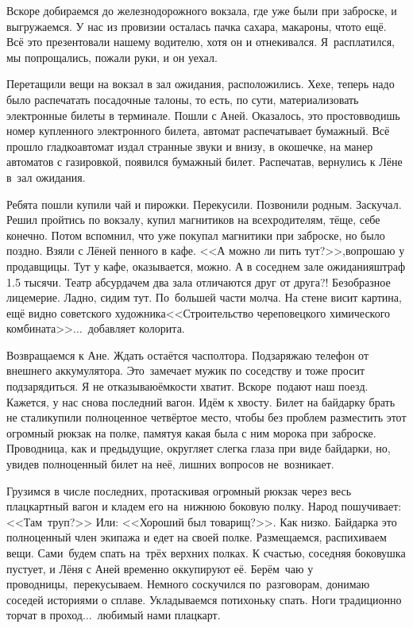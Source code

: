 Вскоре добираемся до железнодорожного вокзала, где уже были при заброске, и выгружаемся. У нас из провизии осталась пачка сахара, макароны, что\sdash то ещё. Всё это презентовали нашему водителю, хотя он и отнекивался. Я~расплатился, мы попрощались, пожали руки, и он уехал. 

Перетащили вещи на вокзал в зал ожидания, расположились. Хе\sdash хе, теперь надо было распечатать посадочные талоны, то есть, по сути, материализовать электронные билеты в терминале. Пошли с Аней. Оказалось, это просто\mdash вводишь номер купленного электронного билета, автомат распечатывает бумажный. Всё прошло гладко\mdash автомат издал странные звуки и внизу, в окошечке, на манер автоматов с газировкой, появился бумажный билет. Распечатав, вернулись к Лёне в~зал ожидания. 

Ребята пошли купили чай и пирожки. Перекусили. Позвонили родным. Заскучал. Решил пройтись по вокзалу, купил магнитиков на всех\mdash родителям, тёще, себе конечно. Потом вспомнил, что уже покупал магнитики при заброске, но было поздно. Взяли с Лёней пенного в кафе. <<А можно ли пить тут?>>,\mdash вопрошаю у продавщицы. Тут у кафе, оказывается, можно. А в соседнем зале ожидания\mdash штраф 1.5 тысячи. Театр абсурда\mdash чем два зала отличаются друг от друга?! Безобразное лицемерие. Ладно, сидим тут. По~большей части молча. На стене висит картина, ещё видно советского художника\mdash <<Строительство череповецкого химического комбината>>$\ldots$~добавляет колорита. 

Возвращаемся к Ане. Ждать остаётся час\sdash полтора. Подзаряжаю телефон от внешнего аккумулятора. Это~замечает мужик по соседству и тоже просит подзарядиться. Я не отказываю\mdash ёмкости хватит. Вскоре~подают наш поезд. Кажется, у нас снова последний вагон. Идём к хвосту. Билет на байдарку брать не стали\mdash купили полноценное четвёртое место, чтобы без проблем разместить этот огромный рюкзак на полке, памятуя какая была с ним морока при заброске. Проводница, как и предыдущие, округляет слегка глаза при виде байдарки, но, увидев полноценный билет на неё, лишних вопросов не~возникает.
 
Грузимся в числе последних, протаскивая огромный рюкзак через весь плацкартный вагон и кладем его на~нижнюю боковую полку. Народ пошучивает: <<Там~труп?>> Или: <<Хороший был товарищ?>>. Как низко. Байдарка это полноценный член экипажа и едет на своей полке. Размещаемся, распихиваем вещи. Сами~будем спать на~трёх верхних полках. К счастью, соседняя боковушка пустует, и Лёня с Аней временно оккупируют её. Берём~чаю у проводницы,~перекусываем. Немного соскучился по~разговорам, донимаю соседей историями о сплаве. Укладываемся потихоньку спать. Ноги традиционно торчат в проход$\ldots$~любимый нами плацкарт.


